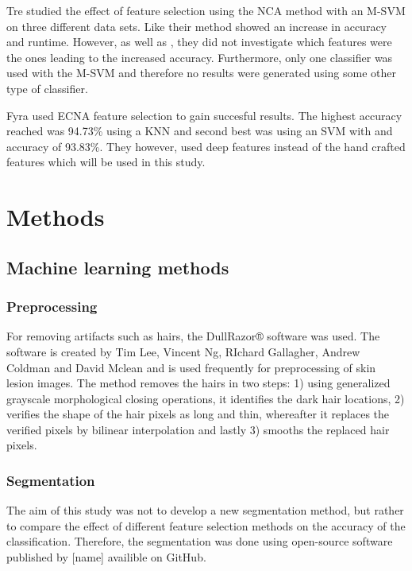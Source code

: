 \documentclass{kththesis}
\begin{document}
Tre studied the effect of feature selection using the NCA method with an M-SVM on three different data sets. Like \parencite{MustafaSuleiman2017Fsus} their method showed an increase in accuracy and runtime. However, as well as \parencite{MustafaSuleiman2017Fsus}, they did not investigate which features were the ones leading to the increased accuracy. Furthermore, only one classifier was used with the M-SVM and therefore no results were generated using some other type of classifier. 

Fyra used ECNA feature selection to gain succesful results. The highest accuracy reached was 94.73\% using a KNN and second best was using an SVM with and accuracy of 93.83\%. They however, used deep features instead of the hand crafted features which will be used in this study.


\chapter{Methods}

\section{Machine learning methods}

\subsection{Preprocessing}

For removing artifacts such as hairs, the DullRazor® software was used. The software is created by Tim Lee, Vincent Ng, RIchard Gallagher, Andrew Coldman and David Mclean and is used frequently for preprocessing of skin lesion images. The method removes the hairs in two steps: 1) using generalized grayscale morphological closing operations, it identifies the dark hair locations, 2) verifies the shape of the hair pixels as long and thin, whereafter it replaces the verified pixels by bilinear interpolation and lastly 3) smooths the replaced hair pixels. \parencite{dermwebDullRazor} %


\subsection{Segmentation}

The aim of this study was not to develop a new segmentation method, but rather to compare the effect of different feature selection methods on the accuracy of the classification. Therefore, the segmentation was done using open-source software published by [name] availible on GitHub. 
\end{document}
